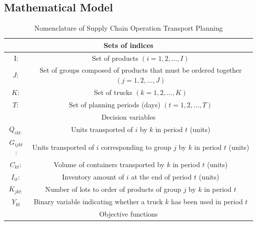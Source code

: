 % 


\FloatBarrier
\begin{ChapterAppendix}
  
\section{Mathematical Model}

\label{appendix:A}
\FloatBarrier
\begin{table}
  \caption{Nomenclature of Supply Chain Operation Transport Planning}
  \begin{tabular}{|c|c|}
    \hline \multicolumn{2}{|c|}{ Sets of indices }                                                                \\
    \hline I:             & Set of products $(i=1,2, \ldots, I)$                                                  \\
    \hline$J:$            & Set of groups composed of products that must be ordered together $(j=1,2, \ldots, J)$ \\
    \hline$K:$            & Set of trucks $(k=1,2, \ldots, K)$                                                    \\
    \hline$T:$            & Set of planning periods (days) $(t=1,2, \ldots, T)$                                   \\
    \hline \multicolumn{2}{|c|}{ Decision variables }                                                             \\
    \hline$Q_{i k t:}$    & Units transported of $i$ by $k$ in period $t$ (units)                                 \\
    \hline$G_{i j k t}$ : & Units transported of $i$ corresponding to group $j$ by $k$ in period $t$ (units)      \\ \hline
    { $C_{k t}:$}         & {Volume of containers transported by $k$ in period $t$ (units)}                       \\
    \hline$I_{i t}:$      & Inventory amount of $i$ at the end of period $t$ (units)                              \\
    \hline$K_{j k t:}$    & Number of lots to order of products of group $j$ by $k$ in period $t$                 \\
    \hline$Y_{k t}$       & Binary variable indicating whether a truck $k$ has been used in period $t$            \\
    \hline \multicolumn{2}{|c|}{ Objective functions }                                                            \\

\end{tabular}
\end{table}
\end{ChapterAppendix}
